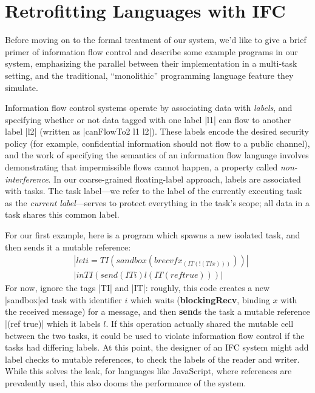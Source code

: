 \section{Retrofitting Languages with IFC}
\label{sec:retrofit}

Before moving on to the formal treatment of our system, we'd like to give
a brief primer of information flow control and describe some example programs
in our system, emphasizing the parallel between their implementation
in a multi-task setting, and the traditional, ``monolithic'' programming
language feature they simulate.

Information flow control systems operate by associating data with \emph{labels},
and specifying whether or not data tagged with one label |l1| can flow
to another
label |l2| (written as |canFlowTo2 l1 l2|).  These labels encode the desired
security policy (for example, confidential information should not flow to
a public channel), and the work of specifying the semantics of an information
flow language involves demonstrating that impermissible flows cannot happen,
a property called \emph{non-interference}.
%
In our coarse-grained floating-label approach, labels are associated with tasks.
%
The task label---we refer to the label of the currently executing task as the
\emph{current label}---serves to protect everything in the task's scope;
all data in a task shares this common label.

For our first example, here is a program which spawns a new isolated task,
and then sends it a mutable reference:
\begin{align*}
    & |let i = TI (sandbox (brecvf x _ (IT (!(TI x)))))|\\
    & |in TI (send (IT i) l (IT (ref true)))|
\end{align*}
For now, ignore the tags |TI| and |IT|: roughly, this code creates a new
|sandbox|ed task with identifier $i$ which waits (\textbf{blockingRecv}, binding $x$ with the received message) for a
message, and then \textbf{send}s the task a mutable reference |(ref
true)| which it labels $l$.  If this operation actually shared the mutable cell between the two tasks, it
could be used to violate information flow control if the tasks had
differing labels.  At this point, the designer of an IFC system might
add label checks to mutable references, to check the labels of the
reader and writer. While this solves the leak, for languages like
JavaScript, where references are prevalently used, this also dooms the
performance of the system.

